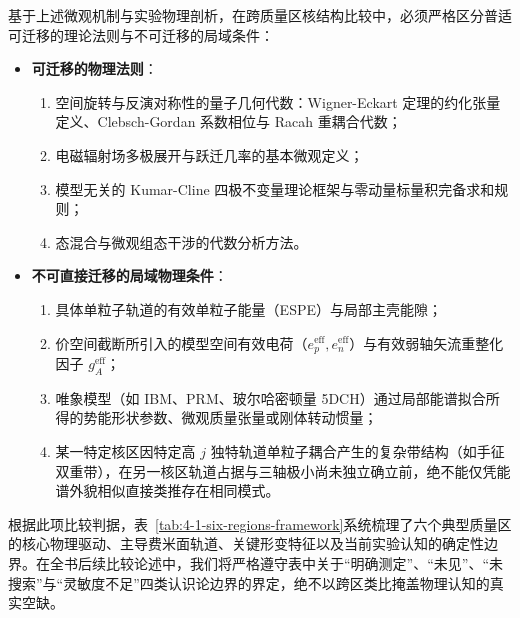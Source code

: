 基于上述微观机制与实验物理剖析，在跨质量区核结构比较中，必须严格区分普适可迁移的理论法则与不可迁移的局域条件：
\begin{itemize}
\item \textbf{可迁移的物理法则}：
  \begin{enumerate}
  \item 空间旋转与反演对称性的量子几何代数：Wigner-Eckart 定理的约化张量定义、Clebsch-Gordan 系数相位与 Racah 重耦合代数\cite{book-suhonen-from-nucleons-to-nucleus}；
  \item 电磁辐射场多极展开与跃迁几率的基本微观定义；
  \item 模型无关的 Kumar-Cline 四极不变量理论框架与零动量标量积完备求和规则\cite{cline-1986-nuclear-shapes-coulomb-excitation}；
  \item 态混合与微观组态干涉的代数分析方法。
  \end{enumerate}
\item \textbf{不可直接迁移的局域物理条件}：
  \begin{enumerate}
  \item 具体单粒子轨道的有效单粒子能量（ESPE）与局部主壳能隙；
  \item 价空间截断所引入的模型空间有效电荷（$e_p^{\mathrm{eff}}, e_n^{\mathrm{eff}}$）与有效弱轴矢流重整化因子 $g_A^{\mathrm{eff}}$；
  \item 唯象模型（如 IBM、PRM、玻尔哈密顿量 5DCH）通过局部能谱拟合所得的势能形状参数、微观质量张量或刚体转动惯量；
  \item 某一特定核区因特定高 $j$ 独特轨道单粒子耦合产生的复杂带结构（如手征双重带），在另一核区轨道占据与三轴极小尚未独立确立前，绝不能仅凭能谱外貌相似直接类推存在相同模式。
  \end{enumerate}
\end{itemize}

根据此项比较判据，表~\ref{tab:4-1-six-regions-framework}系统梳理了六个典型质量区的核心物理驱动、主导费米面轨道、关键形变特征以及当前实验认知的确定性边界。在全书后续比较论述中，我们将严格遵守表中关于``明确测定''、``未见''、``未搜索''与``灵敏度不足''四类认识论边界的界定，绝不以跨区类比掩盖物理认知的真实空缺。

